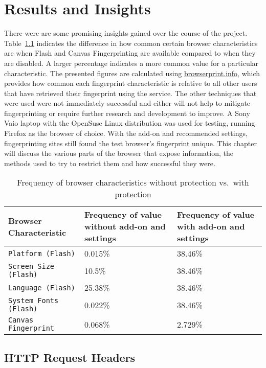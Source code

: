 \chapter{Results and Insights}

There were are some promising insights gained over the course of the project.
Table~\ref{tab:results} indicates the difference in how common certain browser characteristics are when Flash and Canvas Fingerprinting are available compared to when they are disabled.
A larger percentage indicates a more common value for a particular characteristic.
The presented figures are calculated using \url{browserprint.info}, which provides how common each fingerprint characteristic is relative to all other users that have retrieved their fingerprint using the service.
The other techniques that were used were not immediately successful and either will not help to mitigate fingerprinting or require further research and development to improve.
A Sony Vaio laptop with the OpenSuse Linux distribution was used for testing, running Firefox as the browser of choice.
With the add-on and recommended settings, fingerprinting sites still found the test browser's fingerprint unique.
This chapter will discuss the various parts of the browser that expose information, the methods used to try to restrict them and how successful they were.

\begin{table}[h!]
\centering
\begin{tabular}{| p{6cm} | p{4cm} | p{4cm} |}
    \hline
    \textbf{Browser Characteristic} & \textbf{Frequency of value without add-on and settings} & \textbf{Frequency of value with add-on and settings} \\ \hline
    \texttt{Platform (Flash)} & {0.015\%} & {38.46\%} \\ \hline
    \texttt{Screen Size (Flash)} & {10.5\%} & {38.46\%} \\ \hline
    \texttt{Language (Flash)} & {25.38\%} & {38.46\%} \\ \hline
    \texttt{System Fonts (Flash)} & {0.022\%} & {38.46\%} \\ \hline
    \texttt{Canvas Fingerprint} & {0.068\%} & {2.729\%} \\
    \hline
\end{tabular}
\caption{Frequency of browser characteristics without protection vs.\ with protection}
\label{tab:results}
\end{table}

\section{HTTP Request Headers}

